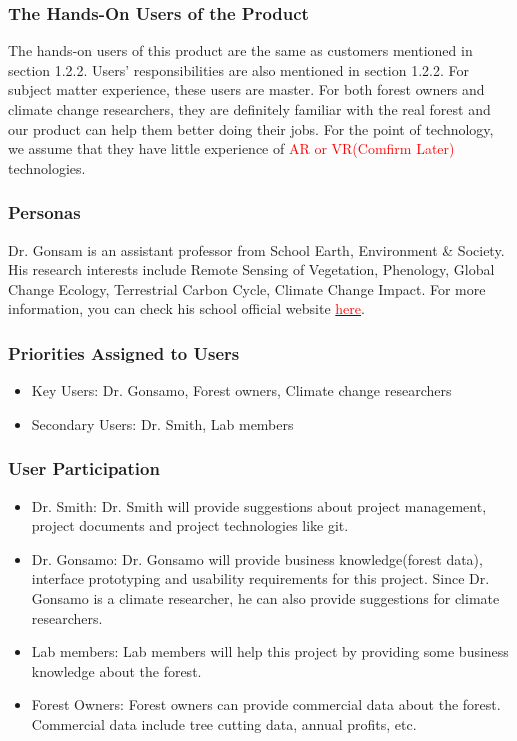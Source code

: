 \documentclass{article}
\begin{document}
\subsubsection{The Hands-On Users of the Product}
The hands-on users of this product are the same as customers mentioned in section 1.2.2. Users'
responsibilities are also mentioned in section 1.2.2. For subject matter experience, these 
users are master. For both forest owners and climate change researchers, they are definitely
familiar with the real forest and our product can help them better doing
their jobs. For the point of technology, we assume that they have little experience of 
\textcolor{red}{AR or VR(Comfirm Later)} technologies.
\subsubsection{Personas}
Dr. Gonsam is an assistant professor from School Earth, Environment \& Society. His research
interests include Remote Sensing of Vegetation, Phenology, Global Change Ecology, Terrestrial Carbon Cycle, Climate Change Impact. For more information, you can check his school official
website \href{https://www.science.mcmaster.ca/ees/component/comprofiler/userprofile/gonsamoa.html}{\textcolor{red}{here}}.
\subsubsection{Priorities Assigned to Users}
\begin{itemize}
    \item Key Users: Dr. Gonsamo, Forest owners, Climate change researchers
    \item Secondary Users: Dr. Smith, Lab members
\end{itemize}
\subsubsection{User Participation}
\begin{itemize}
    \item Dr. Smith: Dr. Smith will provide suggestions about project management, project 
    documents and project technologies like git.
    \item Dr. Gonsamo: Dr. Gonsamo will provide business knowledge(forest data), 
    interface prototyping and usability requirements for this project. Since Dr. Gonsamo is 
    a climate researcher, he can also provide suggestions for climate researchers.
    \item Lab members: Lab members will help this project by providing some business knowledge
    about the forest.
    \item Forest Owners: Forest owners can provide commercial data about the forest. Commercial
    data include tree cutting data, annual profits, etc.
\end{itemize}
\end{document}
